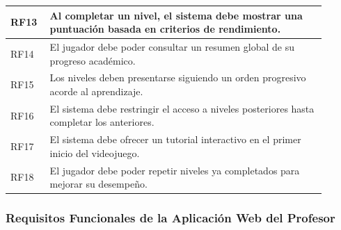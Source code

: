 \begin{longtable}{|p{0.1\linewidth}|p{0.8\linewidth}|}
\hline
RF13 & Al completar un nivel, el sistema debe mostrar una puntuación basada en criterios de rendimiento. \\
\hline
RF14 & El jugador debe poder consultar un resumen global de su progreso académico. \\
\hline
RF15 & Los niveles deben presentarse siguiendo un orden progresivo acorde al aprendizaje. \\
\hline
RF16 & El sistema debe restringir el acceso a niveles posteriores hasta completar los anteriores. \\
\hline
RF17 & El sistema debe ofrecer un tutorial interactivo en el primer inicio del videojuego. \\
\hline
RF18 & El jugador debe poder repetir niveles ya completados para mejorar su desempeño. \\
\hline

\end{longtable}


\subsubsection*{Requisitos Funcionales de la Aplicación Web del Profesor}

